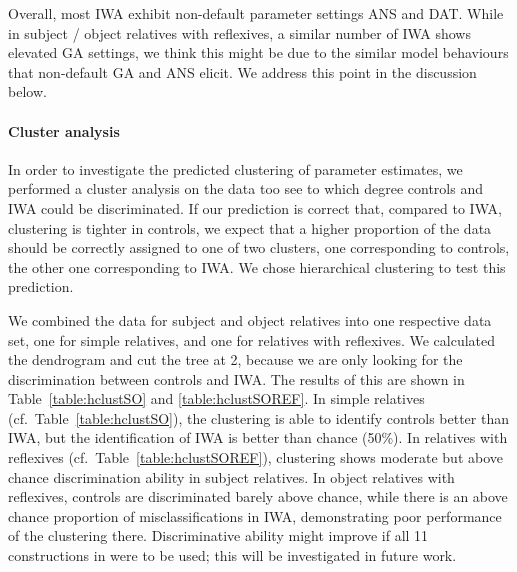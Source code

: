 \documentclass[10pt,letterpaper]{article}
\begin{document}
Overall, most IWA exhibit non-default parameter settings ANS and DAT. While in subject / object relatives with reflexives, a similar number of IWA shows elevated GA settings, we think this might be due to the similar model behaviours that non-default GA and ANS elicit. We address this point in the discussion below.

\paragraph{Cluster analysis} In order to investigate the
 predicted clustering of parameter estimates, we performed a cluster analysis on the data too see to which degree controls and IWA could be discriminated.
If our prediction is correct that, compared to IWA, clustering is tighter in controls, we expect that a higher proportion of the data should be correctly assigned to one of two clusters, one corresponding to controls, the other one corresponding to IWA. We chose hierarchical clustering to test this prediction.%

 We combined the data for subject and object relatives into one respective data set, one for simple relatives, and one for relatives with reflexives.
 We calculated the dendrogram and cut the tree at 2, because we are only looking for the discrimination between controls and IWA. The results of this are shown in Table~\ref{table:hclustSO} and \ref{table:hclustSOREF}. In simple relatives (cf.\ Table~\ref{table:hclustSO}), the clustering is able to identify controls better than IWA, but the identification of IWA is better than chance (50\%). In relatives with reflexives (cf.\ Table~\ref{table:hclustSOREF}), clustering shows moderate but above chance discrimination ability in subject relatives. In object relatives with reflexives, controls are discriminated barely above chance, while there is an above chance proportion of misclassifications in IWA, demonstrating poor performance of the clustering there.
Discriminative ability might improve if all 11 constructions in  were to be used; this will be investigated in future work.
\end{document}
